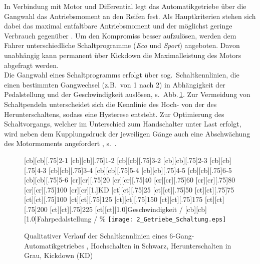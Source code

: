 In Verbindung mit Motor und Differential legt das Automatikgetriebe über die Gangwahl das Antriebsmoment an den Reifen fest. Als Hauptkriterien stehen sich dabei das maximal entfaltbare Antriebsmoment und der möglichst geringe Verbrauch gegenüber \cite{gruhle2010steuerung}. Um den Kompromiss besser aufzulösen, werden dem Fahrer unterschiedliche Schaltprogramme (\zB \emph{Eco} und \emph{Sport}) angeboten. Davon unabhängig kann permanent über Kickdown die Maximalleistung des Motors abgefragt werden. \\
Die Gangwahl eines Schaltprogramms erfolgt über sog.\ Schaltkennlinien, die einen bestimmten Gangwechsel (z.B.\ von 1 nach 2) in Abhängigkeit der Pedalstellung und der Geschwindigkeit auslösen, s.\ Abb.\,\ref{fig:getriebe}. Zur Vermeidung von Schaltpendeln unterscheidet sich die Kennlinie des Hoch- von der des Herunterschaltens, sodass eine Hysterese entsteht.
Zur Optimierung des Schaltvorgangs, welcher im Unterschied zum Handschalter unter Last erfolgt, wird neben dem Kupplungsdruck der jeweiligen Gänge auch eine Abschwächung des Motormoments angefordert \cite{gruhle2010steuerung}, s.\ .

\begin{figure}[h]
\newcommand{\smallsize}{.75}
	[cb][cb][\smallsize]{2-1}
	[cb][cb][\smallsize]{1-2}
	[cb][cb][\smallsize]{3-2}
	[cb][cb][\smallsize]{2-3}
	[cb][cb][\smallsize]{4-3}
	[cb][cb][\smallsize]{3-4}
	[cb][cb][\smallsize]{5-4}
	[cb][cb][\smallsize]{4-5}
	[cb][cb][\smallsize]{6-5}
	[cb][cb][\smallsize]{5-6}
	[cr][cr][\smallsize]{20}
	[cr][cr][\smallsize]{40}
	[cr][cr][\smallsize]{60}
	[cr][cr][\smallsize]{80}
	[cr][cr][\smallsize]{100}
	[cr][cr][1.]{KD}
	[ct][ct][\smallsize]{25}
	[ct][ct][\smallsize]{50}
	[ct][ct][\smallsize]{75}
	[ct][ct][\smallsize]{100}
	[ct][ct][\smallsize]{125}
	[ct][ct][\smallsize]{150}
	[ct][ct][\smallsize]{175}
	[ct][ct][\smallsize]{200}
	[ct][ct][\smallsize]{225}
	[ct][ct][1.0]{Geschwindigkeit / }
	[cb][cb][1.0]{Fahrpedalstellung / \%}
\centering
\texttt{[image: 2\_Getriebe\_Schaltung.eps]}
 \caption[Qualitativer Verlauf der Schaltkennlinien]{Qualitativer Verlauf der Schaltkennlinien eines 6-Gang-Automatikgetriebes \cite{gruhle2010steuerung}, Hochschalten in Schwarz, Herunterschalten in Grau, Kickdown (KD)}
 \label{fig:getriebe}
\end{figure} 


